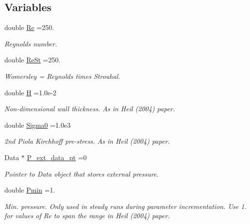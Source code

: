 \subsection*{Variables}
\begin{DoxyCompactItemize}
\item 
double \hyperlink{namespaceGlobal__Physical__Variables_ab814e627d2eb5bc50318879d19ab16b9}{Re} =250.
\begin{DoxyCompactList}\small\item\em Reynolds number. \end{DoxyCompactList}\item 
double \hyperlink{namespaceGlobal__Physical__Variables_a085ee4bf968ffdd01a41b8c41864f907}{Re\+St} =250.
\begin{DoxyCompactList}\small\item\em Womersley = Reynolds times Strouhal. \end{DoxyCompactList}\item 
double \hyperlink{namespaceGlobal__Physical__Variables_af6e07423e22c0991084d9a2f43727805}{H} =1.\+0e-\/2
\begin{DoxyCompactList}\small\item\em Non-\/dimensional wall thickness. As in Heil (2004) paper. \end{DoxyCompactList}\item 
double \hyperlink{namespaceGlobal__Physical__Variables_a417dc688a70c4f06ef0faed047068ba2}{Sigma0} =1.\+0e3
\begin{DoxyCompactList}\small\item\em 2nd Piola Kirchhoff pre-\/stress. As in Heil (2004) paper. \end{DoxyCompactList}\item 
Data $\ast$ \hyperlink{namespaceGlobal__Physical__Variables_ad31ed4ea9a7fce4c20c2230d26047f6f}{P\+\_\+ext\+\_\+data\+\_\+pt} =0
\begin{DoxyCompactList}\small\item\em Pointer to Data object that stores external pressure. \end{DoxyCompactList}\item 
double \hyperlink{namespaceGlobal__Physical__Variables_ae6b6b04387b165c0da5160865170c0e7}{Pmin} =1.
\begin{DoxyCompactList}\small\item\em Min. pressure. Only used in steady runs during parameter incrementation. Use 1. for values of Re to span the range in Heil (2004) paper. \end{DoxyCompactList}\item 

\end{DoxyCompactItemize}
